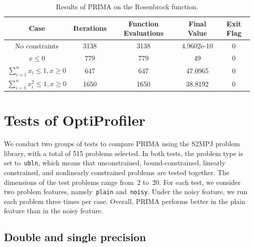 \documentclass[12pt,a4paper]{article}  %
\theoremstyle{definition}
\numberwithin{equation}{section}
\begin{document}
\begin{table}[t]
    \centering
    \caption{Results of PRIMA on the Rosenbrock function.}
    \label{tab:prima_rosenbrock_results}
    \begin{tabular}{ccccc}
        \toprule
        \textbf{Case} & \textbf{Iterations} & \textbf{Function Evaluations} & \textbf{Final Value} & \textbf{Exit Flag} \\
        \midrule
        No constraints & 3138& 3138 &  4.9602e-10 & 0  \\
        $x \leq 0$ & 779 & 779 &  49 & 0 \\
        $\sum_{i=1}^n x_i \leq 1, x \geq 0$ & 647 & 647 &  47.0965 & 0 \\
        $\sum_{i=1}^n x_i^2 \leq 1, x \geq 0$ & 1650 & 1650 &  38.8192 & 0 \\
        \bottomrule
    \end{tabular}
\end{table}

\section{Tests of OptiProfiler}

We conduct two groups of tests to compare PRIMA using the S2MPJ problem library, with a total of 515 problems selected. 
In both tests, the problem type is set to~\texttt{ubln}, which means that unconstrained, bound-constrained, linearly constrained, and nonlinearly constrained problems are tested together. 
The dimensions of the test problems range from~2 to~20. 
For each test, we consider two problem features, namely~\texttt{plain} and~\texttt{noisy}. Under the noisy feature, we run each problem three times per case. Overall, PRIMA performs better in the plain feature than in the noisy feature.

\subsection{Double and single precision}
\end{document}
